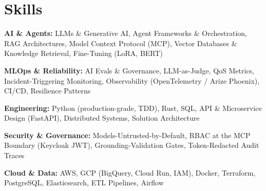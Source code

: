 \documentclass[10pt,a4paper]{article}
\begin{document}
\section{Skills}
\begin{tight}
  \item[\textcolor{accent}{\small$\bullet$}] \textbf{AI \& Agents:} LLMs \& Generative AI, Agent Frameworks \& Orchestration, RAG Architectures, Model Context Protocol (MCP), Vector Databases \& Knowledge Retrieval, Fine-Tuning (LoRA, BERT)
  \item[\textcolor{accent}{\small$\bullet$}] \textbf{MLOps \& Reliability:} AI Evals \& Governance, LLM-as-Judge, QoS Metrics, Incident-Triggering Monitoring, Observability (OpenTelemetry / Arize Phoenix), CI/CD, Resilience Patterns
  \item[\textcolor{accent}{\small$\bullet$}] \textbf{Engineering:} Python (production-grade, TDD), Rust, SQL, API \& Microservice Design (FastAPI), Distributed Systems, Solution Architecture
  \item[\textcolor{accent}{\small$\bullet$}] \textbf{Security \& Governance:} Models-Untrusted-by-Default, RBAC at the MCP Boundary (Keycloak JWT), Grounding-Validation Gates, Token-Redacted Audit Traces
  \item[\textcolor{accent}{\small$\bullet$}] \textbf{Cloud \& Data:} AWS, GCP (BigQuery, Cloud Run, IAM), Docker, Terraform, PostgreSQL, Elasticsearch, ETL Pipelines, Airflow
\end{tight}

\end{document}
